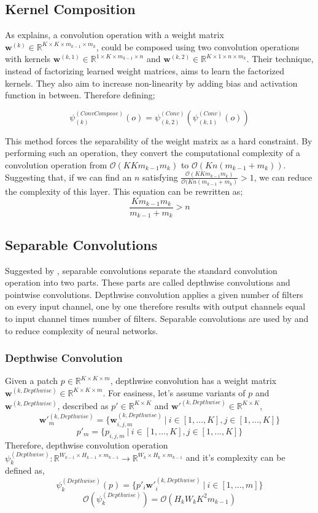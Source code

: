 \subsection{Kernel Composition}
As  \cite{alvarez2016decomposeme} explains, a convolution operation with a weight matrix $\mathbf{w}^{(k)} \in \mathbb{R}^{K \times K \times m_{k-1} \times m_k}$, could be composed using two convolution operations with kernels $\mathbf{w}^{(k,1)} \in \mathbb{R}^{1 \times K \times m_{k-1} \times n}$ and $\mathbf{w}^{(k,2)} \in \mathbb{R}^{K \times 1 \times n \times m_k}$. Their technique, instead of factorizing learned weight matrices, aims to learn the factorized kernels. They also aim to increase non-linearity by adding bias and activation function in between. Therefore defining;

$$ \psi_{(k)}^{(ConvCompose)}(o) = \psi_{(k,2)}^{(Conv)}(\psi_{(k,1)}^{(Conv)}(o))$$

This method forces the separability of the weight matrix as a hard constraint. By performing such an operation, they convert the computational complexity of a convolution operation from $\mathcal{O}(KKm_{k-1}m_k)$ to $\mathcal{O}(Kn(m_{k-1} +m_{k}))$. Suggesting that, if we can find an $n$ satisfying $\frac{\mathcal{O}(KKm_{k-1}m_k)}{\mathcal{O}(Kn(m_{k-1} +m_{k})} > 1$, we can reduce the complexity of this layer. This equation can be rewritten as;
$$ \frac{Km_{k-1}m_k}{m_{k-1} + m_k} > n$$


\subsection{Separable Convolutions}
Suggested by \cite{sifre2014rigid}, separable convolutions separate the standard convolution operation into two parts. These parts are called depthwise convolutions and pointwise convolutions. Depthwise convolution applies a given number of filters on every input channel, one by one therefore results with output channels equal to input channel times number of filters. Separable convolutions are used by \cite{chollet2016xception} and \cite{howard2017mobilenets} to reduce complexity of neural networks.
\subsubsection{Depthwise Convolution}
Given a patch $p \in \mathbb{R}^{K \times K \times m}$, depthwise convolution has a weight matrix $\mathbf{w}^{(k, Depthwise)} \in \mathbb{R}^{K \times K \times m}$. For easiness, let's assume variants of $p$ and $\mathbf{w}^{(k, Depthwise)}$, described as $p' \in \mathbb{R}^{K \times K}$ and $\mathbf{w}'^{(k, Depthwise)}  \in \mathbb{R}^{K \times K}$,
$$\mathbf{w}'^{(k, Depthwise)}_m = \{ \mathbf{w}^{(k, Depthwise)}_{i,j,m} \ | \ i \in [1, \ldots, K], j \in [1, \ldots, K] \}$$
$$p'_m = \{ p_{i,j,m} \ | \ i \in [1, \ldots, K], j \in [1, \ldots, K] \}$$
Therefore, depthwise convolution operation $\psi_k^{(Depthwise)} : \mathbb{R}^{W_{k-1} \times H_{k-1} \times m_{k-1}} \rightarrow \mathbb{R}^{W_{k} \times H_{k} \times m_{k-1}} $ and it's complexity can be defined as, 
$$\psi_k^{(Depthwise)}(p) = \{ p'_i\mathbf{w}'^{(k, Depthwise)}_i \ | \ i \in [1, \ldots, m] \} $$
$$ \mathcal{O} (\psi_k^{(Depthwise)}) = \mathcal{O} (H_kW_kK^2m_{k-1}) $$

